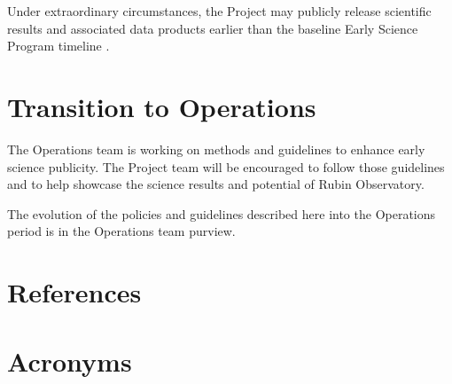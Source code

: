 \documentclass[SE,authoryear,toc]{lsstdoc}
\begin{document}
Under extraordinary circumstances, the Project may publicly release scientific results and associated data products earlier than the baseline Early Science Program timeline .

\section{Transition to Operations}
\label{operations}

The Operations team is working on methods and guidelines to enhance early science publicity.
The Project team will be encouraged to follow those guidelines and to help showcase the science results and potential of Rubin Observatory.

The evolution of the policies and guidelines described here into the Operations period is in the Operations team purview.


\appendix
\section{References} \label{sec:bib}
\renewcommand{\refname}{} %


\section{Acronyms} \label{sec:acronyms}

\end{document}
